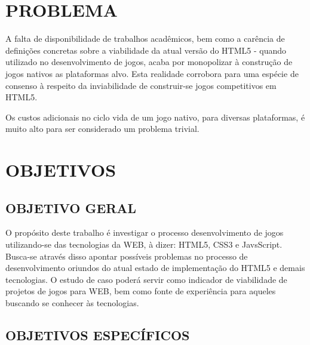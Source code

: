 \documentclass{article}
\begin{document}
\section{PROBLEMA}

A falta de disponibilidade de trabalhos acadêmicos, bem como a carência de definições concretas sobre a viabilidade da atual versão do HTML5 - quando utilizado no desenvolvimento de jogos, acaba por monopolizar à construção de jogos nativos as plataformas alvo. Esta realidade corrobora para uma espécie de consenso à respeito da inviabilidade de construir-se jogos competitivos em HTML5. 

Os custos adicionais no ciclo vida de um jogo nativo, para diversas plataformas, é muito alto para ser considerado um problema trivial.

\section{OBJETIVOS}
\subsection{OBJETIVO GERAL}

O propósito deste trabalho é investigar o processo desenvolvimento de jogos utilizando-se das tecnologias da WEB, à dizer: HTML5, CSS3 e JavsScript. Busca-se através disso apontar possíveis problemas no processo de desenvolvimento oriundos do atual estado de implementação do HTML5 e demais tecnologias. O estudo de caso poderá servir como indicador de viabilidade de projetos de jogos para WEB, bem como fonte de experiência para aqueles buscando se conhecer às tecnologias.

\subsection{OBJETIVOS ESPECÍFICOS}

\end{document}
